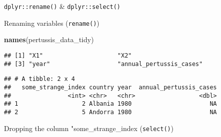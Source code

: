 \documentclass[ignorenonframetext,]{beamer}
\newenvironment{Shaded}{\begin{snugshade}}{\end{snugshade}}
\newcommand{\DataTypeTok}[1]{\textcolor[rgb]{0.13,0.29,0.53}{#1}}
\newcommand{\DecValTok}[1]{\textcolor[rgb]{0.00,0.00,0.81}{#1}}
\newcommand{\KeywordTok}[1]{\textcolor[rgb]{0.13,0.29,0.53}{\textbf{#1}}}
\newcommand{\NormalTok}[1]{#1}
\newcommand{\OperatorTok}[1]{\textcolor[rgb]{0.81,0.36,0.00}{\textbf{#1}}}
\newcommand{\StringTok}[1]{\textcolor[rgb]{0.31,0.60,0.02}{#1}}
\begin{document}
\begin{frame}[fragile]{\texttt{dplyr::rename()} \&
\texttt{dplyr::select()}}
\protect\hypertarget{dplyrrename-dplyrselect}{}

\begin{block}{Renaming variables (\texttt{rename()})}

\begin{Shaded}
\begin{Highlighting}[]
\KeywordTok{names}\NormalTok{(pertussis_data_tidy)}
\end{Highlighting}
\end{Shaded}

\begin{verbatim}
## [1] "X1"                     "X2"                    
## [3] "year"                   "annual_pertussis_cases"
\end{verbatim}

\begin{Shaded}
\end{Shaded}

\begin{verbatim}
## # A tibble: 2 x 4
##   some_strange_index country year  annual_pertussis_cases
##                <int> <chr>   <chr>                  <dbl>
## 1                  2 Albania 1980                      NA
## 2                  5 Andorra 1980                      NA
\end{verbatim}

\end{block}

\begin{block}{Dropping the column "some\_strange\_index
(\texttt{select()})}

\begin{Shaded}
\begin{Highlighting}[]
\NormalTok{pertussis_data_tidy <-}\StringTok{ }\NormalTok{pertussis_data_tidy }\OperatorTok{%>%}
\StringTok{  }\KeywordTok{select}\NormalTok{(country,}
\NormalTok{          year,}
\NormalTok{          annual_pertussis_cases)}

}
\end{Highlighting}
\end{Shaded}
\end{block}
\end{frame}
\end{document}
